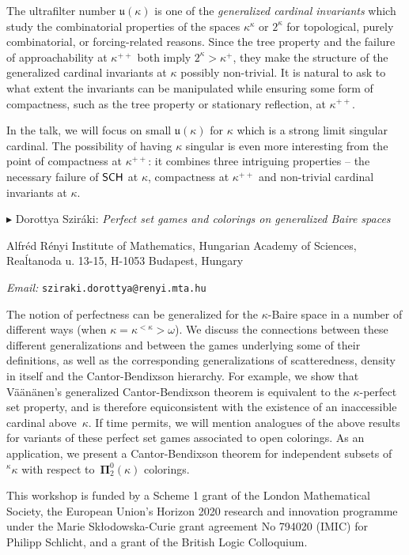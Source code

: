 \documentclass[a4paper]{amsart}
\theoremstyle{remark}
\newcommand{\vsp}{\vspace{20pt}}
\begin{document}
The ultrafilter number $\mathfrak{u}(\kappa)$ is one of the \emph{generalized cardinal invariants} which study the combinatorial properties of the spaces $\kappa^\kappa$ or $2^\kappa$ for topological, purely combinatorial, or forcing-related reasons. Since the tree property and the failure of approachability at $\kappa^{++}$ both imply $2^\kappa>\kappa^+$, they make the structure of the generalized cardinal invariants at $\kappa$ possibly non-trivial. It is natural to ask to what extent the invariants can be manipulated while ensuring some form of compactness, such as the tree property or stationary reflection, at $\kappa^{++}$.

In the talk, we will focus on small $\mathfrak{u}(\kappa)$ for $\kappa$ which is a strong limit singular cardinal. The possibility of having $\kappa$ singular is even more interesting from the point of compactness at $\kappa^{++}$: it combines three intriguing properties -- the necessary failure of $\sf SCH
$ at $\kappa$, compactness at $\kappa^{++}$ and non-trivial cardinal invariants at $\kappa$. 











\vsp 

\noindent 
$\blacktriangleright$ Dorottya Szir\'aki: \emph{Perfect set games and colorings on generalized Baire spaces} 

\noindent 
Alfr\'ed R\'enyi Institute of Mathematics, Hungarian Academy of Sciences, Rea\'ltanoda u. 13-15, H-1053 Budapest, Hungary

\noindent 
\emph{Email:} \texttt{sziraki.dorottya@renyi.mta.hu} 

The notion of perfectness can be generalized
for the $\kappa$-Baire space
in a number of different ways (when $\kappa=\kappa^{<\kappa}>\omega$). 
We 
discuss
the connections between 
these different generalizations and between 
the games underlying some of their definitions, 
as well as 
the corresponding generalizations of 
scatteredness,
density in itself 
and the Cantor-Bendixson hierarchy.
For example, we show that V\"a\"an\"anen's generalized Cantor-Bendixson theorem is equivalent to the $\kappa$-perfect set property, and is therefore equiconsistent with the existence of an inaccessible cardinal above~$\kappa$. 
If time permits, we will mention 
analogues of the above results
for variants of these
perfect set games associated to open colorings.
As an application, we present 
a Cantor-Bendixson theorem
for independent subsets of ${}^\kappa\kappa$ with respect to~$\mathbf{\Pi}^0_2(\kappa)$ colorings.




\vspace{285pt} 
\noindent 
This workshop is funded by a Scheme 1 grant of the London Mathematical Society, the European Union's Horizon 2020 research and innovation programme under the Marie Sk\l odowska-Curie grant agreement No 794020 (IMIC) for Philipp Schlicht, and a grant of the British Logic Colloquium. 




%
%
\end{document}

